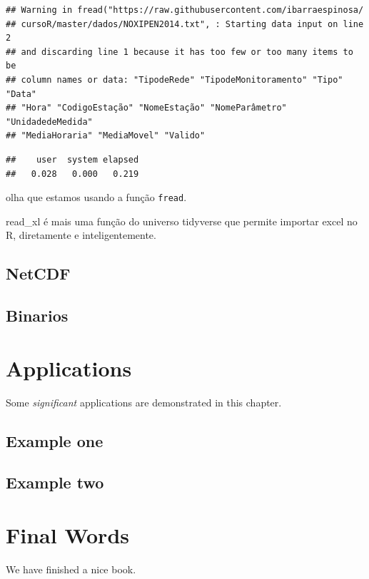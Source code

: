 \documentclass[]{book}
\theoremstyle{definition}
\theoremstyle{definition}
\theoremstyle{definition}
\theoremstyle{remark}
\begin{document}
\begin{verbatim}
## Warning in fread("https://raw.githubusercontent.com/ibarraespinosa/
## cursoR/master/dados/NOXIPEN2014.txt", : Starting data input on line 2
## and discarding line 1 because it has too few or too many items to be
## column names or data: "TipodeRede" "TipodeMonitoramento" "Tipo" "Data"
## "Hora" "CodigoEstação" "NomeEstação" "NomeParâmetro" "UnidadedeMedida"
## "MediaHoraria" "MediaMovel" "Valido"
\end{verbatim}

\begin{verbatim}
##    user  system elapsed 
##   0.028   0.000   0.219
\end{verbatim}

olha que estamos usando a função \texttt{fread}.

read\_xl é mais uma função do universo tidyverse que permite importar
excel no R, diretamente e inteligentemente.

\section{NetCDF}\label{netcdf}

\section{Binarios}\label{binarios}

\chapter{Applications}\label{applications}

Some \emph{significant} applications are demonstrated in this chapter.

\section{Example one}\label{example-one}

\section{Example two}\label{example-two}

\chapter{Final Words}\label{final-words}

We have finished a nice book.


\end{document}
